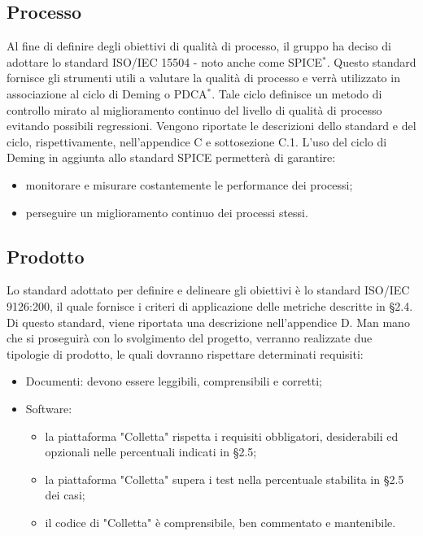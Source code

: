 \subsection{Processo}
Al fine di definire degli obiettivi di qualità di processo, il gruppo ha deciso di adottare lo standard ISO/IEC 15504 - noto anche come SPICE$^*$. Questo standard fornisce gli strumenti utili a valutare la qualità di processo e verrà utilizzato in associazione al ciclo di Deming o PDCA$^*$. Tale ciclo definisce un metodo di controllo mirato al miglioramento continuo del livello di qualità di processo evitando possibili regressioni. 
Vengono riportate le descrizioni dello standard e del ciclo, rispettivamente, nell'appendice C e sottosezione C.1. 
L'uso del ciclo di Deming in aggiunta allo standard SPICE permetterà di garantire:
\begin{itemize}
	\item monitorare e misurare costantemente le performance dei processi;
	\item perseguire un miglioramento continuo dei processi stessi.
\end{itemize}

\subsection{Prodotto}
Lo standard adottato per definire e delineare gli obiettivi è lo standard ISO/IEC 9126:200, il quale fornisce i criteri di applicazione delle metriche descritte in \S2.4. 
Di questo standard, viene riportata una descrizione nell'appendice D.
Man mano che si proseguirà con lo svolgimento del progetto, verranno realizzate due tipologie di prodotto, le quali dovranno rispettare determinati requisiti:
\begin{itemize}
	\item Documenti: devono essere leggibili, comprensibili e corretti;
	\item Software: 
	\begin{itemize}
		\item la piattaforma "Colletta" rispetta i requisiti obbligatori, desiderabili ed opzionali nelle percentuali indicati in \S2.5;
		\item la piattaforma "Colletta" supera i test nella percentuale stabilita in \S2.5 dei casi;
		\item il codice di "Colletta" è comprensibile, ben commentato e mantenibile.
	\end{itemize}
\end{itemize}

